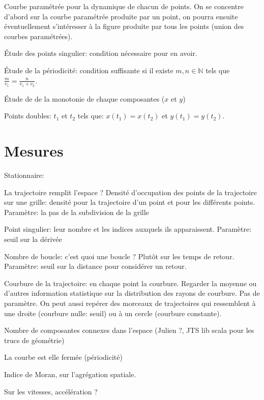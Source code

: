 \documentclass[11pt,a4paper]{article}
\newcommand{\N}{\mathbb N}%
\begin{document}
Courbe paramétrée pour la dynamique de chacun de points. On se concentre d'abord sur la courbe paramétrée produite par un point, on pourra ensuite éventuellement s'intéresser à la figure produite par tous les points (union des courbes paramétrées).

Étude des points singulier: condition nécessaire pour en avoir.

Étude de la périodicité: condition suffisante si il existe $m,n \in \N$ tels que $ \frac{m}{v_1}= \frac{n}{v_1+ v_2}$. 

Étude de de la monotonie de chaque composantes ($x$ et $y$) 

Points doubles: $t_1$ et $t_2$ tels que: $x(t_1)=x(t_2)$ et $y(t_1) = y(t_2)$.



\section{Mesures}
Stationnaire:

La trajectoire remplit l'espace ?
Densité d'occupation des points de la trajectoire sur une grille: densité pour la trajectoire d'un point et pour les différents points. Paramètre: la pas de la subdivision de la grille


Point singulier: leur nombre et les indices auxquels ils apparaissent. Paramètre: seuil sur la dérivée


Nombre de boucle: c'est quoi une boucle ? Plutôt sur les temps de retour. Paramètre: seuil sur la distance pour considérer un retour.

Courbure de la trajectoire: en chaque point la courbure. Regarder la moyenne ou d'autres information statistique sur la distribution des rayons de courbure. Pas de paramètre. On peut aussi repérer des morceaux de trajectoires qui ressemblent à une droite (courbure nulle: seuil) ou à un cercle (courbure constante).

Nombre de composantes connexes dans l'espace (Julien ?, JTS lib scala pour les trucs de géométrie)

La courbe est elle fermée (périodicité)



Indice de Moran, sur l'agrégation spatiale.

Sur les vitesses, accélération ?




 
\end{document}
